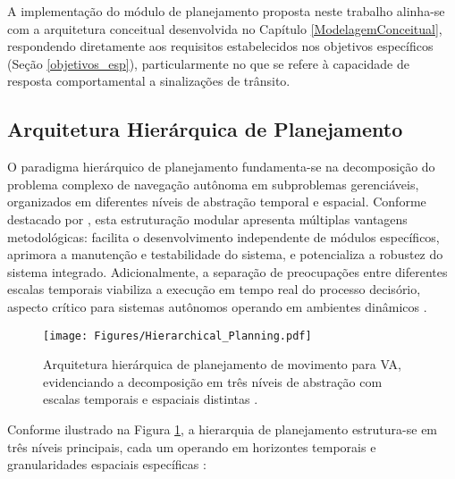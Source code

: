 A implementação do módulo de planejamento proposta neste trabalho alinha-se com a arquitetura conceitual desenvolvida no Capítulo \ref{ModelagemConceitual}, respondendo diretamente aos requisitos estabelecidos nos objetivos específicos (Seção \ref{objetivos_esp}), particularmente no que se refere à capacidade de resposta comportamental a sinalizações de trânsito.

\subsection{Arquitetura Hierárquica de Planejamento} \label{subsec:arquitetura_hierarquica}

O paradigma hierárquico de planejamento fundamenta-se na decomposição do problema complexo de navegação autônoma em subproblemas gerenciáveis, organizados em diferentes níveis de abstração temporal e espacial. Conforme destacado por , esta estruturação modular apresenta múltiplas vantagens metodológicas: facilita o desenvolvimento independente de módulos específicos, aprimora a manutenção e testabilidade do sistema, e potencializa a robustez do sistema integrado. Adicionalmente, a separação de preocupações entre diferentes escalas temporais viabiliza a execução em tempo real do processo decisório, aspecto crítico para sistemas autônomos operando em ambientes dinâmicos \cite[Module 2 - Lesson 1: Driving Missions, Scenarios, and Behaviour]{University_of_Toronto2018-mp}.

\begin{figure}[H]
\centering
\texttt{[image: Figures/Hierarchical\_Planning.pdf]}
\caption{Arquitetura hierárquica de planejamento de movimento para VA, evidenciando a decomposição em três níveis de abstração com escalas temporais e espaciais distintas \cite[Module 2 - Lesson 1: Driving Missions, Scenarios, and Behaviour. ~10min55s]{University_of_Toronto2018-mp}.}
\label{Hierarchical_Planning}
\end{figure}

Conforme ilustrado na Figura \ref{Hierarchical_Planning}, a hierarquia de planejamento estrutura-se em três níveis principais, cada um operando em horizontes temporais e granularidades espaciais específicas \cite{lavalle2006planning, wei2014behavioral}:

